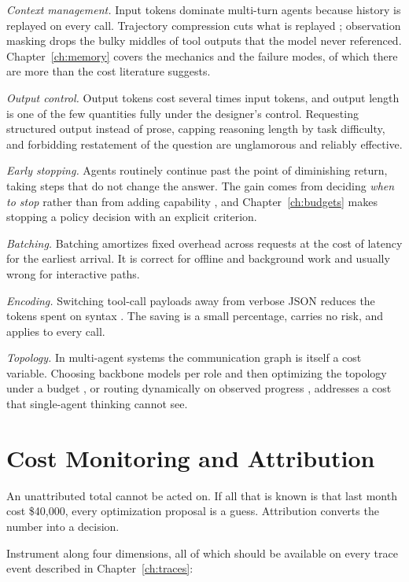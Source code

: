 \documentclass[11pt]{book}
\begin{document}
\textit{Context management.} Input tokens dominate multi-turn agents because history is replayed on every call. Trajectory compression cuts what is replayed \cite{agentdiet2024}; observation masking drops the bulky middles of tool outputs that the model never referenced. Chapter~\ref{ch:memory} covers the mechanics and the failure modes, of which there are more than the cost literature suggests.

\textit{Output control.} Output tokens cost several times input tokens, and output length is one of the few quantities fully under the designer's control. Requesting structured output instead of prose, capping reasoning length by task difficulty, and forbidding restatement of the question are unglamorous and reliably effective.

\textit{Early stopping.} Agents routinely continue past the point of diminishing return, taking steps that do not change the answer. The gain comes from deciding \textit{when to stop} rather than from adding capability \cite{budgettooluse2026}, and Chapter~\ref{ch:budgets} makes stopping a policy decision with an explicit criterion.

\textit{Batching.} Batching amortizes fixed overhead across requests at the cost of latency for the earliest arrival. It is correct for offline and background work and usually wrong for interactive paths.

\textit{Encoding.} Switching tool-call payloads away from verbose JSON reduces the tokens spent on syntax \cite{notation2026}. The saving is a small percentage, carries no risk, and applies to every call.

\textit{Topology.} In multi-agent systems the communication graph is itself a cost variable. Choosing backbone models per role and then optimizing the topology under a budget \cite{scmas2026}, or routing dynamically on observed progress \cite{progrouter2026}, addresses a cost that single-agent thinking cannot see.

\section{Cost Monitoring and Attribution}

An unattributed total cannot be acted on. If all that is known is that last month cost \$40{,}000, every optimization proposal is a guess. Attribution converts the number into a decision.

Instrument along four dimensions, all of which should be available on every trace event described in Chapter~\ref{ch:traces}:
\end{document}
